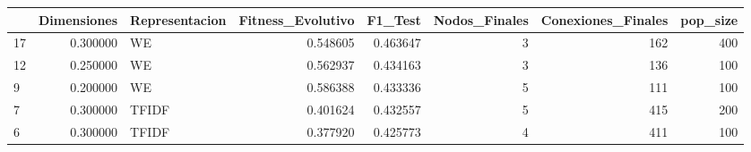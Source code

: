 \begin{tabular}{lrlrrrrr}
\toprule
 & Dimensiones & Representacion & Fitness_Evolutivo & F1_Test & Nodos_Finales & Conexiones_Finales & pop_size \\
\midrule
17 & 0.300000 & WE & 0.548605 & 0.463647 & 3 & 162 & 400 \\
12 & 0.250000 & WE & 0.562937 & 0.434163 & 3 & 136 & 100 \\
9 & 0.200000 & WE & 0.586388 & 0.433336 & 5 & 111 & 100 \\
7 & 0.300000 & TFIDF & 0.401624 & 0.432557 & 5 & 415 & 200 \\
6 & 0.300000 & TFIDF & 0.377920 & 0.425773 & 4 & 411 & 100 \\
\bottomrule
\end{tabular}
